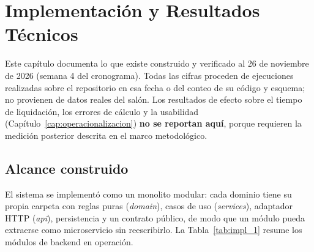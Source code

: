 \section{Implementación y Resultados Técnicos}\label{cap:implementacion}

Este capítulo documenta lo que existe construido y verificado al 26 de noviembre de 2026 (semana 4 del cronograma). Todas las cifras proceden de ejecuciones realizadas sobre el repositorio en esa fecha o del conteo de su código y esquema; no provienen de datos reales del salón. Los resultados de efecto sobre el tiempo de liquidación, los errores de cálculo y la usabilidad (Capítulo~\ref{cap:operacionalizacion}) \textbf{no se reportan aquí}, porque requieren la medición posterior descrita en el marco metodológico.

\subsection{Alcance construido}

El sistema se implementó como un monolito modular: cada dominio tiene su propia carpeta con reglas puras (\textit{domain}), casos de uso (\textit{services}), adaptador HTTP (\textit{api}), persistencia y un contrato público, de modo que un módulo pueda extraerse como microservicio sin reescribirlo. La Tabla~\ref{tab:impl_1} resume los módulos de backend en operación.

